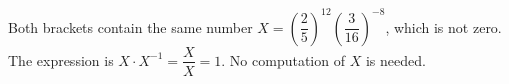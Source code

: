 Both brackets contain the same number $X=\left(\dfrac{2}{5}\right)^{12}\left(\dfrac{3}{16}\right)^{-8}$, which is not zero. The expression is $X\cdot X^{-1}=\dfrac{X}{X}=\boxed{1}$. No computation of $X$ is needed.
